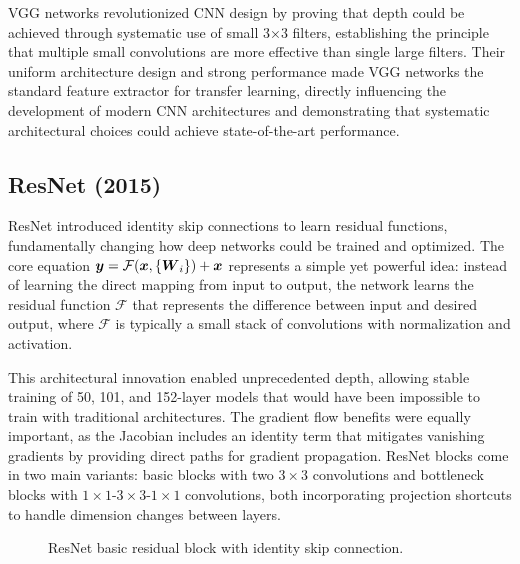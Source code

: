 \begin{remark}
VGG networks revolutionized CNN design by proving that depth could be achieved through systematic use of small 3×3 filters, establishing the principle that multiple small convolutions are more effective than single large filters. Their uniform architecture design and strong performance made VGG networks the standard feature extractor for transfer learning, directly influencing the development of modern CNN architectures and demonstrating that systematic architectural choices could achieve state-of-the-art performance.
\end{remark}

\subsection{ResNet (2015)}
\label{subsec:resnet}

ResNet introduced identity skip connections to learn residual functions, fundamentally changing how deep networks could be trained and optimized. The core equation $\boldsymbol{y} = \mathcal{F}(\boldsymbol{x}, \{\boldsymbol{W}_i\}) + \boldsymbol{x}$ represents a simple yet powerful idea: instead of learning the direct mapping from input to output, the network learns the residual function $\mathcal{F}$ that represents the difference between input and desired output, where $\mathcal{F}$ is typically a small stack of convolutions with normalization and activation.

This architectural innovation enabled unprecedented depth, allowing stable training of 50, 101, and 152-layer models that would have been impossible to train with traditional architectures. The gradient flow benefits were equally important, as the Jacobian includes an identity term that mitigates vanishing gradients by providing direct paths for gradient propagation. ResNet blocks come in two main variants: basic blocks with two $3\times3$ convolutions and bottleneck blocks with $1\times1$-$3\times3$-$1\times1$ convolutions, both incorporating projection shortcuts to handle dimension changes between layers.\cite{He2016}

\begin{figure}[h]
    \centering
    \caption{ResNet basic residual block with identity skip connection.}
    \label{fig:resnet-block}
\end{figure}

